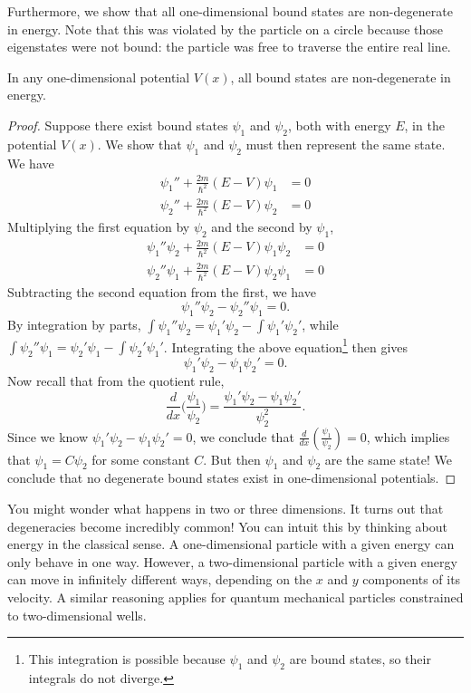 Furthermore, we show that all one-dimensional bound states are non-degenerate in energy. Note that this was violated by the particle on a circle because those eigenstates were not bound: the particle was free to traverse the entire real line.

\begin{framedthm}\label{non-degeneracy_of_bound_states}
    In any one-dimensional potential $V(x)$, all bound states are non-degenerate in energy.

    \begin{proof}
        Suppose there exist bound states $\psi_1$ and $\psi_2$, both with energy $E$, in the potential $V(x)$. We show that $\psi_1$ and $\psi_2$ must then represent the same state. We have \begin{align*}
            \psi_1''+\frac{2m}{\hbar^2}(E-V)\psi_1&=0\\ \psi_2''+\frac{2m}{\hbar^2}(E-V)\psi_2 &= 0
        \end{align*} 
        Multiplying the first equation by $\psi_2$ and the second by $\psi_1$, 
        \begin{align*}
            \psi_1''\psi_2+\frac{2m}{\hbar^2}(E-V)\psi_1\psi_2&=0\\ \psi_2''\psi_1+\frac{2m}{\hbar^2}(E-V)\psi_2\psi_1 &= 0
        \end{align*} 
        Subtracting the second equation from the first, we have $$\psi_1''\psi_2-\psi_2''\psi_1=0.$$
        By integration by parts, $\int\psi_1''\psi_2=\psi_1'\psi_2-\int\psi_1'\psi_2'$, while $\int\psi_2''\psi_1=\psi_2'\psi_1-\int\psi_2'\psi_1'$. Integrating the above equation\footnote{This integration is possible because $\psi_1$ and $\psi_2$ are bound states, so their integrals do not diverge.} then gives $$\psi_1'\psi_2-\psi_1\psi_2'=0.$$Now recall that from the quotient rule, $$\frac{d}{dx}\bigg(\frac{\psi_1}{\psi_2}\bigg)=\frac{\psi_1'\psi_2-\psi_1\psi_2'}{\psi_2^2}.$$Since we know $\psi_1'\psi_2-\psi_1\psi_2'=0$, we conclude that $\frac{d}{dx}(\frac{\psi_1}{\psi_2})=0$, which implies that $\psi_1=C\psi_2$ for some constant $C$. But then $\psi_1$ and $\psi_2$ are the same state! We conclude that no degenerate bound states exist in one-dimensional potentials.
    \end{proof}
\end{framedthm}

\begin{framedrmk*}
    You might wonder what happens in two or three dimensions. It turns out that degeneracies become incredibly common! You can intuit this by thinking about energy in the classical sense. A one-dimensional particle with a given energy can only behave in one way. However, a two-dimensional particle with a given energy can move in infinitely different ways, depending on the $x$ and $y$ components of its velocity. A similar reasoning applies for quantum mechanical particles constrained to two-dimensional wells.
\end{framedrmk*}

